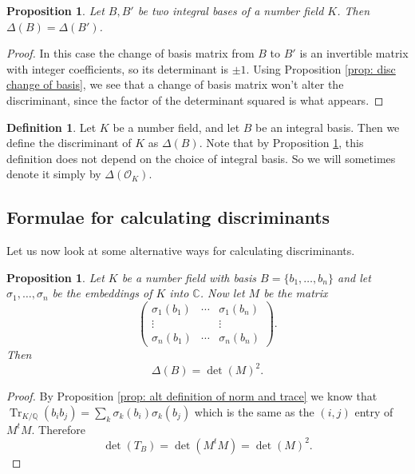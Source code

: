 \documentclass[11pt,a4paper]{report}
\theoremstyle{plain}
\newtheorem{prop}[subsection]{Proposition}
\theoremstyle{definition}
\newtheorem{definition}[subsection]{Definition}
\theoremstyle{definition}
\newcommand{\Tr}{\operatorname{Tr}}
\def\CC{\mathbb{C}}
\def\QQ{\mathbb{Q}}
\def \OO {\mathcal{O}}
\begin{document}
	\begin{prop}\label{prop: int bases disc}
		Let $B,B'$ be two integral bases of a number field $K$. Then $\Delta(B)= \Delta(B')$.
	\end{prop}
	\begin{proof}
		In this case the change of basis matrix from $B$ to $B'$ is an invertible matrix with integer coefficients, so its determinant is $\pm 1$. Using Proposition \ref{prop: disc change of basis}, we see that a change of basis matrix won't alter the discriminant, since the factor of the determinant squared is what appears.
		
		
	\end{proof}
	
	\begin{definition}\label{definition: disc of num field}
		Let $K$ be a number field, and let $B$ be an integral basis. Then we define the discriminant of $K$ as $\Delta(B)$.   Note that by Proposition \ref{prop: int bases disc}, this definition does not depend on the choice of integral basis. So we will sometimes denote it simply by $\Delta(\OO_K)$.
	\end{definition}
	
	
	\subsection{Formulae for calculating discriminants}
	
	Let us now look at some alternative ways for calculating discriminants.
	
	\begin{prop}\label{prop: disc via embs}
		Let $K$ be a number field with basis $B=\{b_1,\dots,b_n\}$ and let $\sigma_1,\dots,\sigma_n$ be the embeddings of $K$ into $\CC$. Now let $M$ be the matrix  \[\left (\begin{matrix} \sigma_1(b_1) &\cdots& \sigma_1(b_n)\\ \vdots & & \vdots \\  \sigma_n(b_1) &\cdots& \sigma_n(b_n)
		\end{matrix} \right ).\] Then \[\Delta(B)=\det(M)^2.\]
	\end{prop}
	
	
	\begin{proof}
		By Proposition \ref{prop: alt definition of norm and trace} we know that  $\Tr_{K/\QQ}(b_i b_j)= \sum_k \sigma_k(b_i)\sigma_k(b_j)$ which is the same as the $(i,j)$ entry of $M^t M$. Therefore \[\det(T_B)=\det(M^t M)=\det(M)^2.\]
	\end{proof}
	
\end{document}
